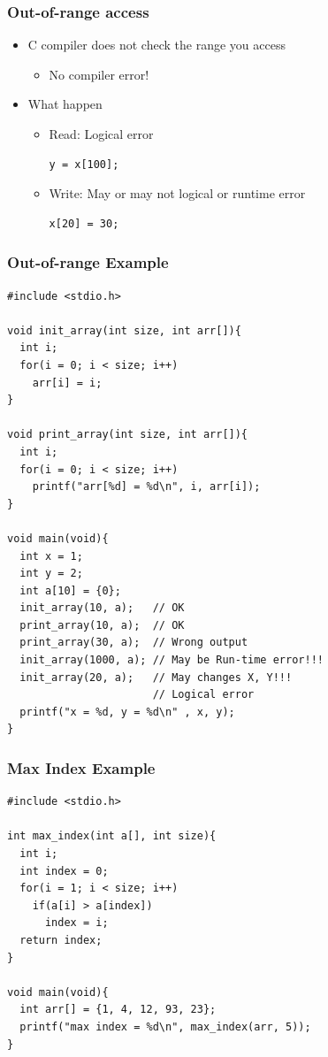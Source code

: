 \documentclass{../c-lecture}
\begin{document}
\begin{frame}[fragile]
  \frametitle{Out-of-range access}
  \begin{itemize}
    \item C compiler does not check the range you access
    \begin{itemize}
      \begin{verbatim}
int x[10]; x[20] = 30; y = x[100];
      \end{verbatim}
      \item No compiler error!
    \end{itemize}
    \item What happen
    \begin{itemize}
      \item Read: Logical error
      \begin{verbatim}
y = x[100];
      \end{verbatim}
      \item Write: May or may not logical or runtime error
      \begin{verbatim}
x[20] = 30;
      \end{verbatim}
    \end{itemize}
  \end{itemize}
\end{frame}

\begin{frame}[fragile]
  \frametitle{Out-of-range Example}
  \begin{verbatim}
#include <stdio.h>

void init_array(int size, int arr[]){
  int i;
  for(i = 0; i < size; i++)
    arr[i] = i;
}

void print_array(int size, int arr[]){
  int i;
  for(i = 0; i < size; i++)
    printf("arr[%d] = %d\n", i, arr[i]);
}

void main(void){
  int x = 1;
  int y = 2;
  int a[10] = {0};
  init_array(10, a);   // OK
  print_array(10, a);  // OK
  print_array(30, a);  // Wrong output
  init_array(1000, a); // May be Run-time error!!!
  init_array(20, a);   // May changes X, Y!!!
                       // Logical error
  printf("x = %d, y = %d\n" , x, y);
}
  \end{verbatim}
\end{frame}

\begin{frame}[fragile]
  \frametitle{Max Index Example}
  \begin{verbatim}
#include <stdio.h>

int max_index(int a[], int size){
  int i;
  int index = 0;
  for(i = 1; i < size; i++)
    if(a[i] > a[index])
      index = i;
  return index;
}

void main(void){
  int arr[] = {1, 4, 12, 93, 23};
  printf("max index = %d\n", max_index(arr, 5));
}
  \end{verbatim}
\end{frame}
\end{document}
